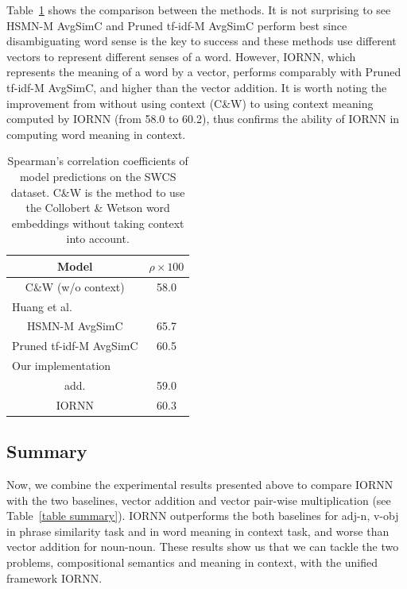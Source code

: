 \documentclass[11pt]{article}
\begin{document}
Table~\ref{table swsc result} shows the comparison between the methods.
It is not surprising to see HSMN-M AvgSimC and Pruned tf-idf-M AvgSimC perform best since disambiguating
word sense is the key to success and these methods use different vectors to represent different senses of a word.
However, IORNN, which represents the meaning of a word by a vector, performs comparably 
with Pruned tf-idf-M AvgSimC, and higher than the vector addition. It is worth noting the improvement from 
without using context (C\&W) to using context meaning computed by IORNN (from 58.0 to 60.2), thus 
confirms the ability of IORNN in computing word meaning in context.

\begin{table}[!ht]
	\center
	\begin{tabular}{cc}
		\hline
		Model & $\rho \times 100$ \\ \hline \hline

		C\&W (w/o context) & 58.0 \\ \hline
		
		\multicolumn{2}{l}{Huang et al.} \\
		HSMN-M AvgSimC & 65.7 \\ 
		Pruned tf-idf-M AvgSimC & 60.5 \\ \hline 
		
		\multicolumn{2}{l}{Our implementation} \\
		add. & 59.0 \\
		IORNN & 60.3 \\ \hline
		
	\end{tabular}
	\caption{Spearman's correlation coefficients of model predictions on the SWCS dataset.
	C\&W is the method to use the Collobert \& Wetson word embeddings without taking context into account. }
	\label{table swsc result}
\end{table}


 

\subsection{Summary} 

Now, we combine the experimental results presented above to compare IORNN 
with the two baselines, vector addition and vector pair-wise multiplication 
(see Table~\ref{table summary}). IORNN outperforms the both baselines for adj-n, v-obj
in phrase similarity task and in word meaning in context task, 
and worse than vector addition for noun-noun. These results show us that we can 
tackle the two problems, compositional semantics and meaning in context, with the unified framework 
IORNN.
\end{document}
